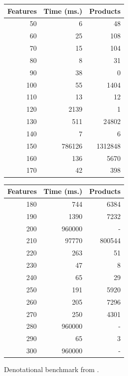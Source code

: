 \begin{figure}[t]
        \centering
        \begin{minipage}{0.4\hsize}
        \begin{tabular}{|rrr|}
                        \hline
                Features&       Time (ms.)&    Products\\
                        \hline
                50 & 6 & 48 \\
                60 & 25 & 108 \\
                70 & 15 & 104 \\
                80 & 8 & 31 \\
                90 & 38 & 0 \\
                100 & 55 & 1404 \\
                110 & 13 & 12 \\
                120 & 2139 & 1 \\
                130 & 511 & 24802 \\
                140 & 7 & 6 \\
                150 & 786126 & 1312848 \\
                160 & 136 & 5670 \\
                170 & 42 & 398 \\
                \hline
        \end{tabular}
        \end{minipage}
        \begin{minipage}{0.4\hsize}
        \begin{tabular}{|rrr|}
                \hline
                Features&       Time (ms.)&    Products\\
                        \hline
180 & 744 & 6384 \\
190 & 1390 & 7232 \\
200 & 960000 & - \\
210 & 97770 & 800544 \\
220 & 263 & 51 \\
230 & 47 & 8 \\
240 & 65 & 29 \\
250 & 191 & 5920 \\
260 & 205 & 7296 \\
270 & 250 & 4301 \\
280 & 960000 & - \\
290 & 65 & 3 \\
300 & 960000 & - \\
                \hline
        \end{tabular}
        \end{minipage}
        \caption{Denotational benchmark from \cite{acl13}.\label{figure:tool:den:benchmark}}
\end{figure}




